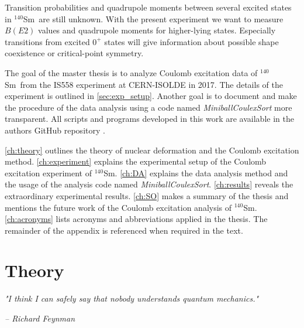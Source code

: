 \documentclass[twoside,english]{uiofysmaster/uiofysmaster}
\newcommand{\Sm}{$^{140}$Sm} %
\let\orgautoref\autoref
\renewcommand{\autoref}
        {%
		 \def\sectionautorefname{Section}%
		 \def\subsectionautorefname{Section}%
		 \def\subsubsectionautorefname{Section}%
		 \def\chapterautorefname{Chapter}%
          \orgautoref}
\begin{document}
Transition probabilities and quadrupole moments between several excited states in \Sm\ are still unknown.
With the present experiment we want to measure $B(E2)$ values and quadrupole moments for higher-lying states.
Especially transitions from excited $0^+$ states will give information about possible shape coexistence or critical-point symmetry. 

The goal of the master thesis is to analyze Coulomb excitation data of \Sm\ from the IS558 experiment at CERN-ISOLDE in 2017. 
The details of the experiment is outlined in \autoref{sec:exp_setup}. 
Another goal is to document and make the procedure of the data analysis using a code named \textsl{MiniballCoulexSort} more transparent.
All scripts and programs developed in this work are available in the authors GitHub repository \cite{GH-repo}.

\autoref{ch:theory} outlines the theory of nuclear deformation and the Coulomb excitation method. 
\autoref{ch:experiment} explains the experimental setup of the Coulomb excitation experiment of \Sm.
\autoref{ch:DA} explains the data analysis method and the usage of the analysis code named \textsl{MiniballCoulexSort}.
\autoref{ch:results} reveals the extraordinary experimental results.
\autoref{ch:SO} makes a summary of the thesis and mentions the future work of the Coulomb excitation analysis of \Sm.
\autoref{ch:acronyms} lists acronyms and abbreviations applied in the thesis. 
The remainder of the appendix is referenced when required in the text.



\chapter{Theory}\label{ch:theory}
\epigraph{\textit{"I think I can safely say that nobody understands quantum mechanics."}}{\textit{– Richard Feynman}}
\end{document}
